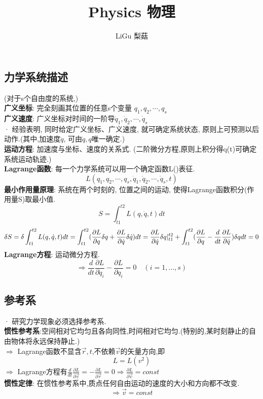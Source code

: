 \documentclass{article}
\title{Physics 物理}\author{LiGu 梨菇}\date{}
\begin{document}
\maketitle

\section{}
\subsection{力学系统描述}
(对于s个自由度的系统,)\\
\textbf{广义坐标}: 完全刻画其位置的任意s个变量 $q_{1},q_{2},\cdots,q_{s}$\\
\textbf{广义速度}: 广义坐标对时间的一阶导$\dot q_{1},\dot q_{2},\cdots,\dot q_{s}$\\
· 经验表明, 同时给定广义坐标、广义速度, 就可确定系统状态, 原则上可预测以后动作.(其中,加速度$\ddot q$, 可由$\dot q,q$唯一确定.)\\
\textbf{运动方程}: 加速度与坐标、速度的关系式. (二阶微分方程,原则上积分得q(t)可确定系统运动轨迹.)\\
\textbf{Lagrange函数}: 每一个力学系统可以用一个确定函数L()表征.
$$L(q_{1},q_{2},\cdots,q_{s},\dot q_{1},\dot q_{2},\cdots,\dot q_{s},t)$$
\textbf{最小作用量原理}: 系统在两个时刻的, 位置之间的运动, 使得Lagrange函数积分(作用量S)取最小值.
$$S = \int_{t1}^{t2} L(q,\dot q,t)dt$$
$$\delta S = \delta \int_{t1}^{t2} L(q,\dot q,t)dt = \int_{t1}^{t2} (\frac{\partial L}{\partial q}\delta q + \frac{\partial L}{\partial \dot q}\delta \dot q) dt = \frac{\partial L}{\partial \dot q} \delta q \arrowvert_{t1}^{t2} + \int_{t1}^{t2} (\frac{\partial L}{\partial q} - \frac{d}{dt} \frac{\partial L}{\partial \dot q}) \delta q dt = 0$$
\textbf{Lagrange方程}: 运动微分方程. 
$$\Rightarrow \frac{d}{dt}\frac{\partial L}{\partial \dot q_i} - \frac{\partial L}{\partial q_i} = 0\quad(i=1,\dots,s)$$


\subsection{参考系}
· 研究力学现象必须选择参考系.\\
\textbf{惯性参考系}:空间相对它均匀且各向同性,时间相对它均匀.(特别的,某时刻静止的自由物体将永远保持静止.)\\
$\Rightarrow$ Lagrange函数不显含$\vec r,t$,不依赖$\vec v$的矢量方向,即
$$L = L(v^2)$$
$\Rightarrow$ Lagrange方程有$\frac{d}{dt}\frac{\partial L}{\partial \vec v} = -\frac{\partial L}{\partial \vec r} = 0 \Rightarrow \frac{\partial L}{\partial \vec v}=const$\\
\textbf{惯性定律}: 在惯性参考系中,质点任何自由运动的速度的大小和方向都不改变.
$$\Rightarrow \vec v = const$$
\end{document}
